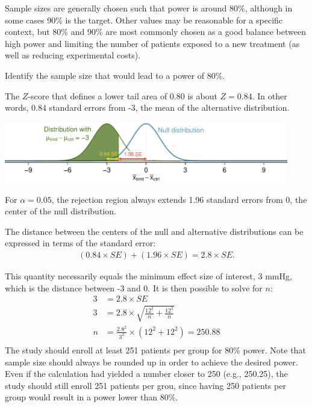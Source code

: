 Sample sizes are generally chosen such that power is around 80\%, although in some cases 90\% is the target. Other values may be reasonable for a specific context, but 80\% and 90\% are most commonly chosen as a good balance between high power and limiting the number of patients exposed to a new treatment (as well as reducing experimental costs). 

\textD{\newpage}

\begin{examplewrap}
\begin{nexample}{Identify the sample size that would lead to a power of 80\%.}

The $Z$-score that defines a lower tail area of 0.80 is about $Z = 0.84$. In other words, 0.84 standard errors from -3, the mean of the alternative distribution. 

\begin{center}
\includegraphics[width=0.93\textwidth]{ch_inference_for_means_oi_biostat/figures/power_best_sample_size/power_best_sample_size}
\end{center}

For $\alpha = 0.05$, the rejection region always extends 1.96 standard errors from 0, the center of the null distribution. 

The distance between the centers of the null and alternative distributions can be expressed in terms of the standard error:
\begin{align*}
(0.84 \times SE) + (1.96 \times SE) = 2.8 \times SE.
\end{align*}

This quantity necessarily equals the minimum effect size of interest, 3 mmHg, which is the distance between -3 and 0. It is then possible to solve for $n$:
\begin{align*}
3 &= 2.8 \times SE \\
3 &= 2.8 \times \sqrt{\frac{12^2}{n} + \frac{12^2}{n}} \\
n &= \frac{2.8^2}{3^2} \times \left( 12^2 + 12^2 \right) = 250.88 \\
\end{align*}
The study should enroll at least 251 patients per group for 80\% power. Note that sample size should always be rounded up in order to achieve the desired power. Even if the calculation had yielded a number closer to 250 (e.g., 250.25), the study should still enroll 251 patients per grou, since having 250 patients per group would result in a power lower than 80\%.
\end{nexample}
\end{examplewrap}

